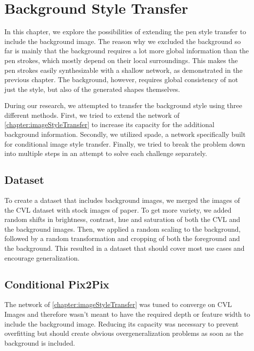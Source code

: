\chapter{Background Style Transfer}\label{chapter:backgroundStyleTransfer}

In this chapter, we explore the possibilities of extending the pen style transfer to include the background image. The reason why we excluded the background so far is mainly that the background requires a lot more global information than the pen strokes, which mostly depend on their local surroundings. This makes the pen strokes easily synthesizable with a shallow network, as demonstrated in the previous chapter. The background, however, requires global consistency of not just the style, but also of the generated shapes themselves.

During our research, we attempted to transfer the background style using three different methods. First, we tried to extend the network of \cref{chapter:imageStyleTransfer} to increase its capacity for the additional background information. Secondly, we utilized \gls{spade}, a network specifically built for conditional image style transfer. Finally, we tried to break the problem down into multiple steps in an attempt to solve each challenge separately.

\section{Dataset}\label{section:backgroundDataset}
To create a dataset that includes background images, we merged the images of the CVL dataset with stock images of paper. To get more variety, we added random shifts in brightness, contrast, hue and saturation of both the CVL and the background images. Then, we applied a random scaling to the background, followed by a random transformation and cropping of both the foreground and the background. This resulted in a dataset that should cover most use cases and encourage generalization.


\section{Conditional Pix2Pix}\label{section:backgroundTransferPix2pix}

The network of \cref{chapter:imageStyleTransfer} was tuned to converge on CVL Images and therefore wasn't meant to have the required depth or feature width to include the background image. Reducing its capacity was necessary to prevent overfitting but should create obvious overgeneralization problems as soon as the background is included.



